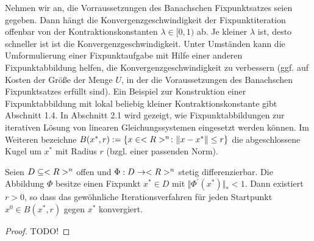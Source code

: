 Nehmen wir an, die Vorraussetzungen des Banachschen Fixpunktsatzes seien gegeben. Dann hängt die Konvergenzgeschwindigkeit der Fixpunktiteration offenbar von der Kontraktionskonstanten $\lambda \in [0,1)$ ab. Je kleiner $\lambda$ ist, desto schneller ist ist die Konvergenzgeschwindigkeit. Unter Umständen kann die Umformulierung einer Fixpunktaufgabe mit Hilfe einer anderen Fixpunktabbildung helfen, die Konvergenzgeschwindigkeit zu verbessern (ggf. auf Kosten der Größe der Menge $U$, in der die Voraussetzungen des Banachschen Fixpunktsatzes erfüllt sind). Ein Beispiel zur Konstruktion einer Fixpunktabbildung mit lokal beliebig kleiner Kontraktionskonstante gibt Abschnitt 1.4. In Abschnitt 2.1 wird gezeigt, wie Fixpunktabbildungen zur iterativen Lösung von linearen Gleichungssystemen eingesetzt werden können.
Im Weiteren bezeichne $B(x^{\ast}, r) := \{ x \in <R>^n \colon \Vert x - x^\ast \Vert \le r \}$ die abgeschlossene Kugel um $x^{\ast}$ mit Radius $r$ (bzgl. einer passenden Norm). 

\begin{proposition}[Ostrowski]
	Seien $D \subseteq <R>^n$ offen und $\Phi: D \to <R>^n$ stetig differenzierbar. Die Abbildung $\Phi$ besitze einen Fixpunkt $x^{\ast} \in D$ mit $\Vert \Phi^{'}(x^{\ast})\Vert_{\ast} < 1$. Dann existiert $r > 0$, so dass das gewöhnliche Iterationsverfahren für jeden Startpunkt $x^0 \in B(x^{\ast}, r)$ gegen $x^{\ast}$ konvergiert.
\end{proposition}

\begin{proof}
	TODO!
\end{proof}